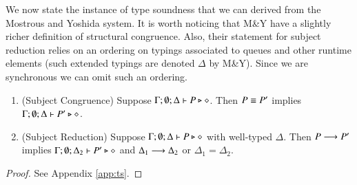 We now state the instance of type soundness that we can derived from the Mostrous and Yoshida system.
It is worth noticing that M\&Y have a slightly richer definition of structural congruence.
Also, their statement for subject reduction relies on an ordering on typings associated to queues and other 
runtime elements (such extended typings are denoted $\Delta$ by M\&Y).
Since we are synchronous we can omit such an ordering.

\begin{theorem}\label{t:sr}\rm
	\begin{enumerate}[1.]
		\item	(Subject Congruence) Suppose $\Gamma; \emptyset; \Delta \vdash P \triangleright \diamond$.
			Then $P \equiv P'$ implies $\Gamma; \emptyset; \Delta \vdash P' \triangleright \diamond$.

		\item	(Subject Reduction) Suppose $\Gamma; \emptyset; \Delta \vdash P \triangleright \diamond$
			with
			well-typed $\Delta$.
			Then $P \longrightarrow P'$ implies $\Gamma; \emptyset; \Delta_2  \vdash P' \triangleright \diamond$
			and $\Delta_1 \longrightarrow \Delta_2$ or $\Delta_1 = \Delta_2$.
	\end{enumerate}
\end{theorem}

\begin{proof}
See Appendix \ref{app:ts}.
\end{proof}
